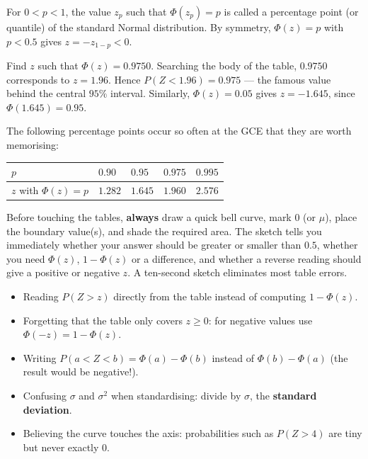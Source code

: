 \documentclass[11pt]{article}
\newcommand{\cle}[1]{{\popxbold\color{popdark}#1}}
\begin{document}
\begin{definition}
For $0 < p < 1$, the value $z_p$ such that $\Phi(z_p) = p$ is called a \cle{percentage point} (or quantile) of the standard Normal distribution. By symmetry, $\Phi(z) = p$ with $p < 0.5$ gives $z = -z_{1-p} < 0$.
\end{definition}

\begin{exemplebox}
Find $z$ such that $\Phi(z) = 0.9750$. Searching the body of the table, $0.9750$ corresponds to $z = 1.96$. Hence $P(Z < 1.96) = 0.975$ --- the famous value behind the central $95\%$ interval. Similarly, $\Phi(z) = 0.05$ gives $z = -1.645$, since $\Phi(1.645) = 0.95$.
\end{exemplebox}

The following percentage points occur so often at the GCE that they are worth memorising:

\begin{center}
\begin{tabularx}{\linewidth}{|l|X|X|X|X|}
\hline
\rowcolor{popblueL} $p$ & $0.90$ & $0.95$ & $0.975$ & $0.995$ \\
\hline
$z$ with $\Phi(z)=p$ & $1.282$ & $1.645$ & $1.960$ & $2.576$ \\
\hline
\end{tabularx}
\end{center}

\begin{methode}
Before touching the tables, \textbf{always} draw a quick bell curve, mark $0$ (or $\mu$), place the boundary value(s), and shade the required area. The sketch tells you immediately whether your answer should be greater or smaller than $0.5$, whether you need $\Phi(z)$, $1-\Phi(z)$ or a difference, and whether a reverse reading should give a positive or negative $z$. A ten-second sketch eliminates most table errors.
\end{methode}

\begin{attention}
\begin{itemize}
\item Reading $P(Z > z)$ directly from the table instead of computing $1 - \Phi(z)$.
\item Forgetting that the table only covers $z \geq 0$: for negative values use $\Phi(-z) = 1 - \Phi(z)$.
\item Writing $P(a<Z<b) = \Phi(a) - \Phi(b)$ instead of $\Phi(b) - \Phi(a)$ (the result would be negative!).
\item Confusing $\sigma$ and $\sigma^2$ when standardising: divide by $\sigma$, the \textbf{standard deviation}.
\item Believing the curve touches the axis: probabilities such as $P(Z > 4)$ are tiny but never exactly $0$.
\end{itemize}
\end{attention}
\end{document}
